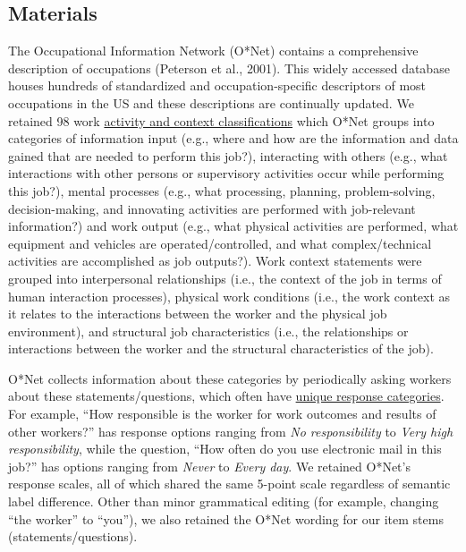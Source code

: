 \documentclass[
  english,
  man]{apa6}
\begin{document}
\hypertarget{materials}{%
\subsection{Materials}\label{materials}}

The Occupational Information Network (O*Net) contains a comprehensive description of occupations (Peterson et al., 2001). This widely accessed database houses hundreds of standardized and occupation-specific descriptors of most occupations in the US and these descriptions are continually updated. We retained 98 work \href{https://www.ONETonline.org/find/descriptor/result/4.A.1.b.3}{activity and context classifications} which O*Net groups into categories of information input (e.g., where and how are the information and data gained that are needed to perform this job?), interacting with others (e.g., what interactions with other persons or supervisory activities occur while performing this job?), mental processes (e.g., what processing, planning, problem-solving, decision-making, and innovating activities are performed with job-relevant information?) and work output (e.g., what physical activities are performed, what equipment and vehicles are operated/controlled, and what complex/technical activities are accomplished as job outputs?). Work context statements were grouped into interpersonal relationships (i.e., the context of the job in terms of human interaction processes), physical work conditions (i.e., the work context as it relates to the interactions between the worker and the physical job environment), and structural job characteristics (i.e., the relationships or interactions between the worker and the structural characteristics of the job).

O*Net collects information about these categories by periodically asking workers about these statements/questions, which often have \href{https://www.ONETonline.org/find/descriptor/result/4.C.1.c.2}{unique response categories}. For example, ``How responsible is the worker for work outcomes and results of other workers?'' has response options ranging from \emph{No responsibility} to \emph{Very high responsibility}, while the question, ``How often do you use electronic mail in this job?'' has options ranging from \emph{Never} to \emph{Every day}. We retained O*Net's response scales, all of which shared the same 5-point scale regardless of semantic label difference. Other than minor grammatical editing (for example, changing ``the worker'' to ``you''), we also retained the O*Net wording for our item stems (statements/questions).
\end{document}
